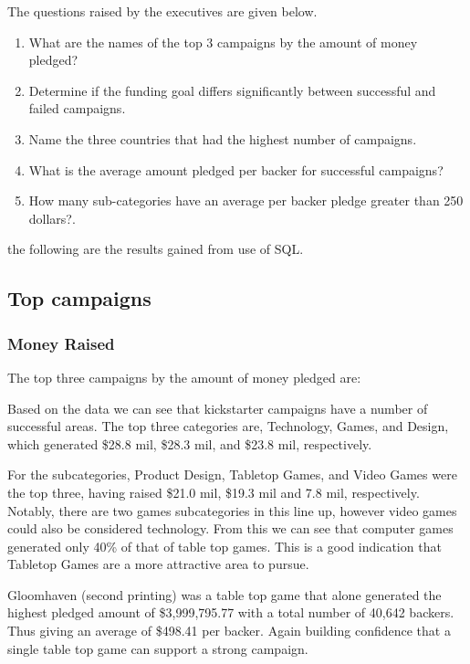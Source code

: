 \documentclass{article}
\begin{document}
\noindent The questions raised by the executives are given below. 

\begin{enumerate}
\item What are the names of the top 3 campaigns by the amount of money pledged?
\item Determine if the funding goal differs significantly between successful and failed campaigns.
\item Name the three countries that had the highest number of campaigns.
\item What is the average amount pledged per backer for successful campaigns?
\item How many sub-categories have an average per backer pledge greater than 250 dollars?.
\end{enumerate}

\noindent  the following are the results gained from use of SQL.

\medskip
\subsection{Top campaigns}

\subsubsection{Money Raised}
The top three campaigns  by the amount of money pledged are:

\noindent Based on the data we can see that kickstarter campaigns have a number of successful areas. The top three categories are, Technology, Games, and Design, which generated \$28.8 mil, \$28.3 mil, and \$23.8 mil, respectively. 

\medskip

\noindent For the subcategories, Product Design, Tabletop Games, and Video Games were the top three, having raised \$21.0 mil, \$19.3 mil and 7.8 mil, respectively. Notably, there are two games subcategories in this line up, however video games could also be considered technology. From this we can see that computer games generated only 40\% of that of table top games. This is a good indication that Tabletop Games are a more attractive area to pursue. 


\medskip

\noindent Gloomhaven (second printing) was a table top game that alone generated the highest pledged amount of \$3,999,795.77 with a total number of 40,642 backers. Thus giving an average of \$498.41 per backer. Again building confidence that a single table top game can support a strong campaign.  
\end{document}

